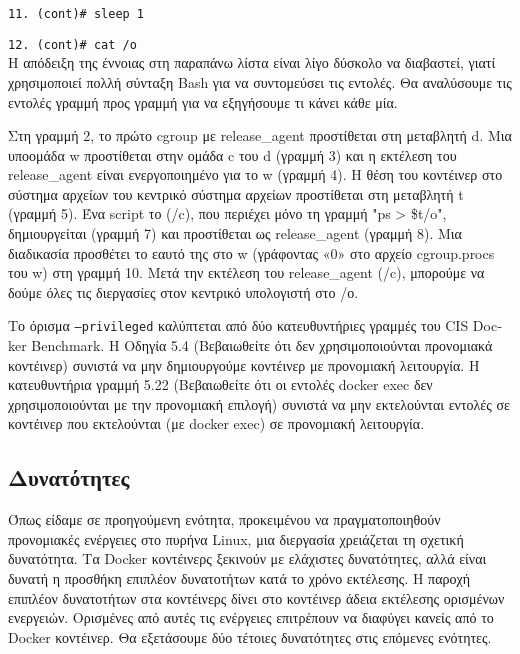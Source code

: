 \texttt{\textlatin{11. (cont)\# sleep 1}}

\texttt{\textlatin{12. (cont)\# cat /o}} \\

Η απόδειξη της έννοιας στη παραπάνω λίστα είναι λίγο δύσκολο να διαβαστεί,
γιατί χρησιμοποιεί πολλή σύνταξη \textlatin{Bash} για να συντομεύσει τις
εντολές. Θα αναλύσουμε τις εντολές γραμμή προς γραμμή για να εξηγήσουμε τι
κάνει κάθε μία.

Στη γραμμή 2, το πρώτο \textlatin{cgroup} με \textlatin{release\_agent}
προστίθεται στη μεταβλητή \textlatin{d}. Μια υποομάδα \textlatin{w} προστίθεται
στην ομάδα \textlatin{c} του \textlatin{d} (γραμμή 3) και η εκτέλεση του
\textlatin{release\_agent} είναι ενεργοποιημένο για το \textlatin{w} (γραμμή 4).
Η θέση του κοντέινερ στο σύστημα αρχείων του κεντρικό σύστημα αρχείων
προστίθεται στη μεταβλητή \textlatin{t} (γραμμή 5). Ένα \textlatin{script}
το (/\textlatin{c}), που περιέχει μόνο τη γραμμή "\textlatin{ps > \$t/o"},
δημιουργείται (γραμμή 7) και προστίθεται
ως \textlatin{release\_agent} (γραμμή 8). Μια διαδικασία προσθέτει το εαυτό της
στο \textlatin{w} (γράφοντας «0» στο αρχείο \textlatin{cgroup.procs} του 
\textlatin{w}) στη γραμμή 10. Μετά την εκτέλεση του \textlatin{release\_agent}
(/\textlatin{c}), μπορούμε να δούμε όλες τις διεργασίες στον κεντρικό
υπολογιστή στο /\textlatin{ο}.

Το όρισμα \texttt{\textlatin{--privileged}} καλύπτεται από δύο κατευθυντήριες
γραμμές του \textlatin{CIS Docker Benchmark}. Η Οδηγία 5.4 (Βεβαιωθείτε ότι δεν
χρησιμοποιούνται προνομιακά κοντέινερ) συνιστά να μην δημιουργούμε κοντέινερ με
προνομιακή λειτουργία. Η κατευθυντήρια γραμμή 5.22 (Βεβαιωθείτε ότι οι εντολές
\textlatin{docker exec} δεν χρησιμοποιούνται με την προνομιακή επιλογή) συνιστά
να μην εκτελούνται εντολές σε κοντέινερ που εκτελούνται (με
\textlatin{docker exec}) σε προνομιακή λειτουργία.

\subsection{Δυνατότητες}

Όπως είδαμε σε προηγούμενη ενότητα, προκειμένου να πραγματοποιηθούν προνομιακές
ενέργειες στο πυρήνα \textlatin{Linux}, μια διεργασία χρειάζεται τη σχετική
δυνατότητα. Τα \textlatin{Docker} κοντέινερς ξεκινούν με ελάχιστες δυνατότητες, αλλά είναι
δυνατή η προσθήκη επιπλέον δυνατοτήτων κατά το χρόνο εκτέλεσης. Η παροχή
επιπλέον δυνατοτήτων στα κοντέινερς δίνει στο κοντέινερ άδεια εκτέλεσης
ορισμένων ενεργειών. Ορισμένες από αυτές τις ενέργειες επιτρέπουν να διαφύγει
κανείς από το \textlatin{Docker} κοντέινερ. Θα εξετάσουμε δύο τέτοιες
δυνατότητες στις επόμενες ενότητες.



